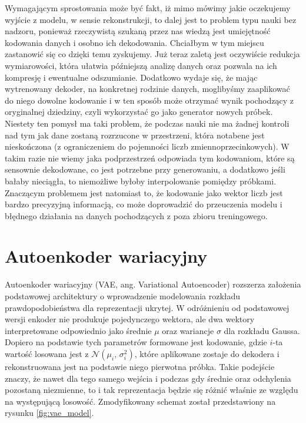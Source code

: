 Wymagającym sprostowania może być fakt, iż mimo mówimy jakie oczekujemy wyjście z modelu, w sensie rekonstrukcji, to dalej jest to problem typu nauki bez nadzoru, ponieważ rzeczywistą szukaną przez nas wiedzą jest umiejętność kodowania danych i osobno ich dekodowania. Chciałbym w tym miejscu zastanowić się co dzięki temu zyskujemy. Już teraz zaletą jest oczywiście redukcja wymiarowości, która ułatwia późniejszą analizę danych oraz pozwala na ich kompresję i ewentualne odszumianie. Dodatkowo wydaje się, że mając wytrenowany dekoder, na konkretnej rodzinie danych, moglibyśmy zaaplikować do niego dowolne kodowanie i w ten sposób może otrzymać wynik pochodzący z oryginalnej dziedziny, czyli wykorzystać go jako generator nowych próbek. Niestety ten pomysł ma taki problem, że podczas nauki nie ma żadnej kontroli nad tym jak dane zostaną rozrzucone w przestrzeni, która notabene jest nieskończona (z ograniczeniem do pojemności liczb zmiennoprzecinkowych). W takim razie nie wiemy jaka podprzestrzeń odpowiada tym kodowaniom, które są sensownie dekodowane, co jest potrzebne przy generowaniu, a dodatkowo jeśli bałaby nieciągła, to niemożliwe byłoby interpolowanie pomiędzy próbkami. Znaczącym problemem jest natomiast to, że kodowanie jako wektor liczb jest bardzo precyzyjną informacją, co może doprowadzić do przeuczenia modelu i błędnego działania na danych pochodzących z poza zbioru treningowego.

\section{Autoenkoder wariacyjny} \label{sec:vae}

Autoenkoder wariacyjny (VAE, ang. Variational Autoencoder) rozszerza założenia podstawowej architektury o wprowadzenie modelowania rozkładu prawdopodobieństwa dla reprezentacji ukrytej. W odróżnieniu od podstawowej wersji enkoder nie produkuje pojedynczego wektora, ale dwa wektory interpretowane odpowiednio jako średnie $\mu$ oraz wariancje $\sigma$ dla rozkładu Gaussa. Dopiero na podstawie tych parametrów formowane jest kodowanie, gdzie $i$-ta wartość losowana jest z $\mathcal{N}(\mu_{i},\,\sigma_{i}^{2})$, które aplikowane zostaje do dekodera i rekonstruowana jest na podstawie niego pierwotna próbka. Takie podejście znaczy, że nawet dla tego samego wejścia i podczas gdy średnie oraz odchylenia pozostaną niezmienne, to i tak reprezentacja będzie się różnić właśnie ze względu na występującą losowość. Zmodyfikowany schemat został przedstawiony na rysunku \ref{fig:vae_model}.

